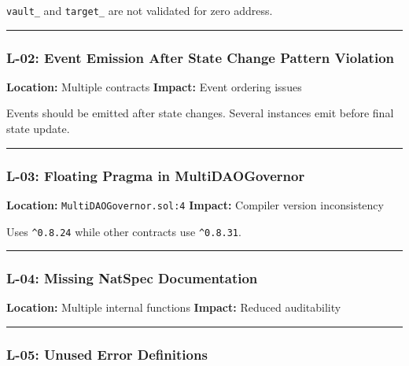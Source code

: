 \documentclass[
]{article}
\begin{document}
\texttt{vault\_} and \texttt{target\_} are not validated for zero
address.

\begin{center}\rule{0.5\linewidth}{0.5pt}\end{center}

\subsubsection{L-02: Event Emission After State Change Pattern
Violation}\label{l-02-event-emission-after-state-change-pattern-violation}

\textbf{Location:} Multiple contracts \textbf{Impact:} Event ordering
issues

Events should be emitted after state changes. Several instances emit
before final state update.

\begin{center}\rule{0.5\linewidth}{0.5pt}\end{center}

\subsubsection{L-03: Floating Pragma in
MultiDAOGovernor}\label{l-03-floating-pragma-in-multidaogovernor}

\textbf{Location:} \texttt{MultiDAOGovernor.sol:4} \textbf{Impact:}
Compiler version inconsistency

Uses \texttt{\^{}0.8.24} while other contracts use \texttt{\^{}0.8.31}.

\begin{center}\rule{0.5\linewidth}{0.5pt}\end{center}

\subsubsection{L-04: Missing NatSpec
Documentation}\label{l-04-missing-natspec-documentation}

\textbf{Location:} Multiple internal functions \textbf{Impact:} Reduced
auditability

\begin{center}\rule{0.5\linewidth}{0.5pt}\end{center}

\subsubsection{L-05: Unused Error
Definitions}\label{l-05-unused-error-definitions}
\end{document}
